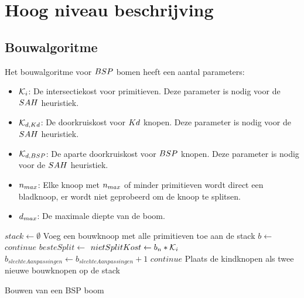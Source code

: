 \section{Hoog niveau beschrijving}
\label{sec:h4-hoog-niveau}
\subsection{Bouwalgoritme}
Het bouwalgoritme voor $BSP$ bomen heeft een aantal parameters:
\begin{itemize}
    \item $\mathcal{K}_i$: De intersectiekost voor primitieven. Deze parameter is nodig voor de $SAH$ heuristiek.
    \item $\mathcal{K}_{d,Kd}$: De doorkruiskost voor $Kd$ knopen. Deze parameter is nodig voor de $SAH$ heuristiek.
    \item $\mathcal{K}_{d,BSP}$: De aparte doorkruiskost voor $BSP$ knopen. Deze parameter is nodig voor de $SAH$ heuristiek.
    \item $n_{max}$: Elke knoop met $n_{max}$ of minder primitieven wordt direct een bladknoop, er wordt niet geprobeerd om de knoop te splitsen.
    \item $d_{max}$: De maximale diepte van de boom.
\end{itemize}
\begin{dutchalgorithm}
    \begin{algorithmic}
        \State $stack\gets \emptyset$
        \State Voeg een bouwknoop met alle primitieven toe aan de stack
            \State $b \gets $
                \State {}
                \State $continue$
            \EndIf
            \State $besteSplit \gets $ 
            \State $nietSplitKost \gets  b_{n}*\mathcal{K}_i$
                \State $b_{slechteAanpassingen} \gets b_{slechteAanpassingen} + 1$
            \EndIf
                \State {}
                \State $continue$
            \EndIf
            \State {}
            \State Plaats de kindknopen als twee nieuwe bouwknopen op de stack
        \EndWhile
    \end{algorithmic}
    \caption{Bouwen van een BSP boom}
    \label{alg:bsp-bouw}
\end{dutchalgorithm}

